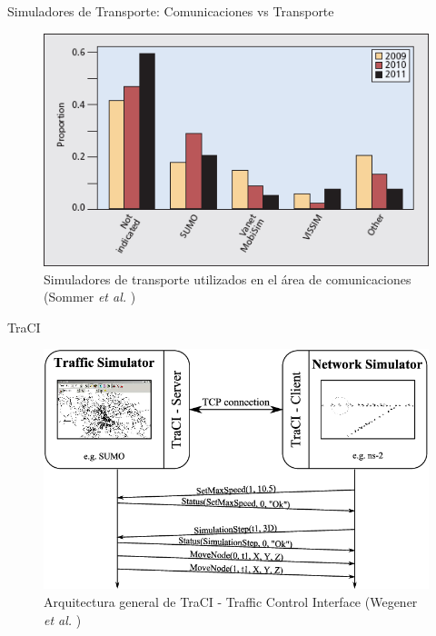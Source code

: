 \documentclass[aspectratio=169]{beamer}
\begin{document}
\begin{frame}{Simuladores de Transporte: Comunicaciones vs Transporte}
\begin{figure}[p]
\centering
\includegraphics[height=.7\textheight]{figuras/trafficsims_comp}
\caption{Simuladores de transporte utilizados en el área de comunicaciones\\(Sommer \emph{et al.} \autocite{sommer_dressler2})}
\label{fig:trafficsimscomp}
\end{figure}
\end{frame}

\begin{frame}{TraCI}
\begin{figure}
    \centering
    \includegraphics[width=.7\linewidth]{figuras/traci-arch.png}
    \caption{Arquitectura general de TraCI - Traffic Control Interface (Wegener \emph{et al.} \autocite{traci})}
    \label{fig:traci}
\end{figure}
\end{frame}
\end{document}

